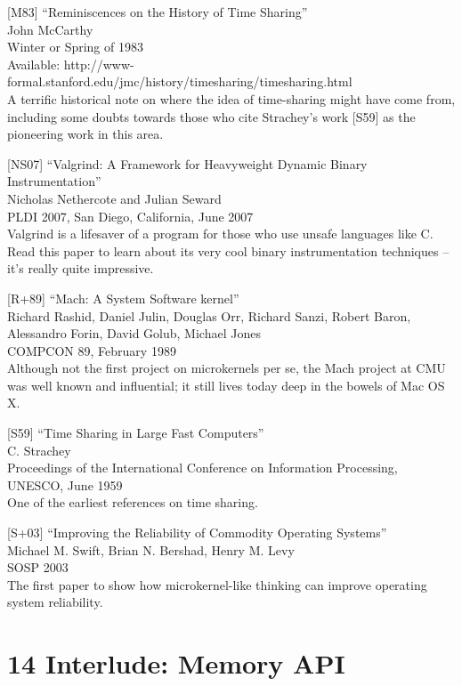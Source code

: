 {[}M83{]} ``Reminiscences on the History of Time Sharing''\\
John McCarthy\\
Winter or Spring of 1983\\
Available:
http://www-formal.stanford.edu/jmc/history/timesharing/timesharing.html\\
A terrific historical note on where the idea of time-sharing might have
come from, including some doubts towards those who cite Strachey's work
{[}S59{]} as the pioneering work in this area.

{[}NS07{]} ``Valgrind: A Framework for Heavyweight Dynamic Binary
Instrumentation''\\
Nicholas Nethercote and Julian Seward\\
PLDI 2007, San Diego, California, June 2007\\
Valgrind is a lifesaver of a program for those who use unsafe languages
like C. Read this paper to learn about its very cool binary
instrumentation techniques -- it's really quite impressive.

{[}R+89{]} ``Mach: A System Software kernel''\\
Richard Rashid, Daniel Julin, Douglas Orr, Richard Sanzi, Robert Baron,
Alessandro Forin, David Golub, Michael Jones\\
COMPCON 89, February 1989\\
Although not the first project on microkernels per se, the Mach project
at CMU was well known and influential; it still lives today deep in the
bowels of Mac OS X.

{[}S59{]} ``Time Sharing in Large Fast Computers''\\
C. Strachey\\
Proceedings of the International Conference on Information Processing,
UNESCO, June 1959\\
One of the earliest references on time sharing.

{[}S+03{]} ``Improving the Reliability of Commodity Operating
Systems''\\
Michael M. Swift, Brian N. Bershad, Henry M. Levy\\
SOSP 2003\\
The first paper to show how microkernel-like thinking can improve
operating system reliability.

\hypertarget{interlude-memory-api}{%
\section*{14 Interlude: Memory API}\label{interlude-memory-api}}

